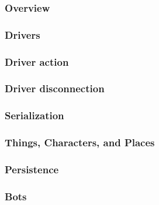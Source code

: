 \subsubsection{Overview}
\label{impl:overview}


\subsubsection{Drivers}
\label{sec:impl:drivers}


\subsubsection{Driver action}
\label{sec:impl:driver-action}


\subsubsection{Driver disconnection}
\label{sec:impl:driver-disconnection}


\subsubsection{Serialization}
\label{sec:impl:serialization}


\subsubsection{Things, Characters, and Places}
\label{sec:impl:objects}


\subsubsection{Persistence}
\label{sec:impl:persistence}


\subsubsection{Bots}
\label{sec:impl:bots}

